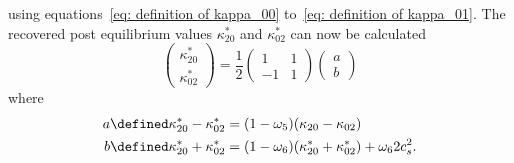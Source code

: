 using equations~\eqref{eq: definition of kappa_00} to~\eqref{eq: definition of kappa_01}.
The recovered post equilibrium values $\kappa_{20}^{*}$ and $\kappa_{02}^{*}$ can now be calculated
\begin{equation}
  \begin{pmatrix}
    \kappa_{20}^{*} \\
    \kappa_{02}^{*}
  \end{pmatrix}
  = \frac{1}{2}
  \begin{pmatrix}
    1 & 1 \\ -1 & 1
  \end{pmatrix}
  \begin{pmatrix}
    a\\
    b
  \end{pmatrix}
\end{equation}
where
\begin{equation}
 \begin{aligned}
   a \defined \kappa_{20}^{*} - \kappa_{02}^{*}
     & = (1-\omega_5) (\kappa_{20} - \kappa_{02}) \\
   b \defined \kappa_{20}^{*} + \kappa_{02}^{*}
     & = (1-\omega_6)(\kappa_{20}^{*} + \kappa_{02}^{*}) + \omega_6 2 c_s^2 .
 \end{aligned}
\end{equation}
